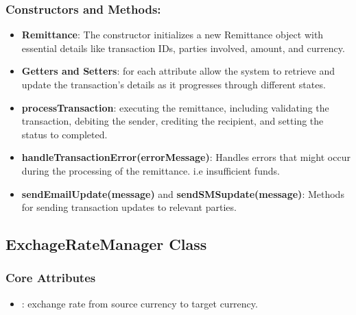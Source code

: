 \documentclass[onecolumn, letterpaper, ]{report}
\begin{document}
            \subsubsection{Constructors and Methods:}
            \begin{itemize}
                \item \textbf{Remittance}: The constructor initializes a new Remittance object with essential details like transaction IDs, parties involved, amount, and currency.
                \item \textbf{Getters and Setters}: for each attribute allow the system to retrieve and update the transaction's details as it progresses through different states.
                \item \textbf{processTransaction}: executing the remittance, including validating the transaction, debiting the sender, crediting the recipient, and setting the status to completed.
                \item \textbf{handleTransactionError(errorMessage)}: Handles errors that might occur during the processing of the remittance. i.e insufficient funds.
                \item \textbf{sendEmailUpdate(message)} and \textbf{sendSMSupdate(message)}: Methods for sending transaction updates to relevant parties. 
            \end{itemize}

        \subsection{ExchageRateManager Class}

            \subsubsection{Core Attributes}
            \begin{itemize}
                \item \textbf{}: exchange rate from source currency to target currency. 
            \end{itemize}
                
\end{document}
